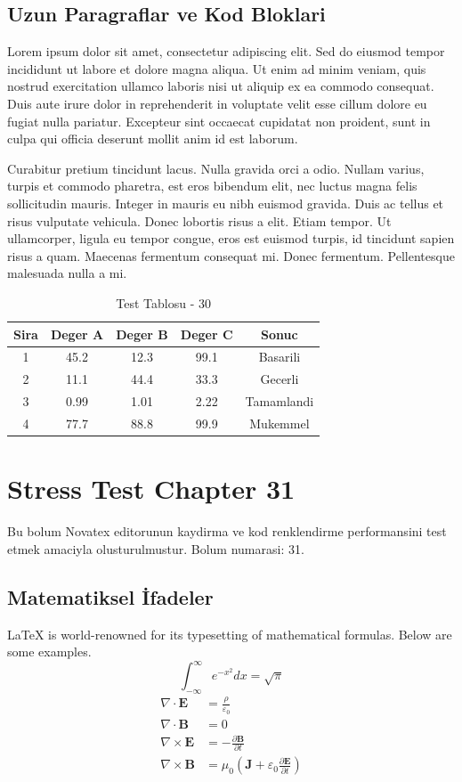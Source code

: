 \documentclass[12pt,a4paper]{article}
\begin{document}
\subsection{Uzun Paragraflar ve Kod Bloklari}
Lorem ipsum dolor sit amet, consectetur adipiscing elit. Sed do eiusmod tempor incididunt ut labore et dolore magna aliqua. Ut enim ad minim veniam, quis nostrud exercitation ullamco laboris nisi ut aliquip ex ea commodo consequat. Duis aute irure dolor in reprehenderit in voluptate velit esse cillum dolore eu fugiat nulla pariatur. Excepteur sint occaecat cupidatat non proident, sunt in culpa qui officia deserunt mollit anim id est laborum.

Curabitur pretium tincidunt lacus. Nulla gravida orci a odio. Nullam varius, turpis et commodo pharetra, est eros bibendum elit, nec luctus magna felis sollicitudin mauris. Integer in mauris eu nibh euismod gravida. Duis ac tellus et risus vulputate vehicula. Donec lobortis risus a elit. Etiam tempor. Ut ullamcorper, ligula eu tempor congue, eros est euismod turpis, id tincidunt sapien risus a quam. Maecenas fermentum consequat mi. Donec fermentum. Pellentesque malesuada nulla a mi.

\begin{table}[h!]
\centering
\begin{tabular}{|c|c|c|c|c|}
\hline
\textbf{Sira} & \textbf{Deger A} & \textbf{Deger B} & \textbf{Deger C} & \textbf{Sonuc} \\
\hline
1 & 45.2 & 12.3 & 99.1 & Basarili \\
2 & 11.1 & 44.4 & 33.3 & Gecerli \\
3 & 0.99 & 1.01 & 2.22 & Tamamlandi \\
4 & 77.7 & 88.8 & 99.9 & Mukemmel \\
\hline
\end{tabular}
\caption{Test Tablosu - 30}
\end{table}

\newpage
\section{Stress Test Chapter 31}
Bu bolum Novatex editorunun kaydirma ve kod renklendirme performansini test etmek amaciyla olusturulmustur. Bolum numarasi: 31.

\subsection{Matematiksel İfadeler}
\LaTeX{} is world-renowned for its typesetting of mathematical formulas. Below are some examples.
\begin{equation}
\int_{-\infty}^{\infty} e^{-x^2} dx = \sqrt{\pi}
\end{equation}
\begin{align}
\nabla \cdot \mathbf{E} &= \frac{\rho}{\varepsilon_0} \\
\nabla \cdot \mathbf{B} &= 0 \\
\nabla \times \mathbf{E} &= -\frac{\partial \mathbf{B}}{\partial t} \\
\nabla \times \mathbf{B} &= \mu_0\left(\mathbf{J} + \varepsilon_0 \frac{\partial \mathbf{E}}{\partial t}\right)
\end{align}
\end{document}

